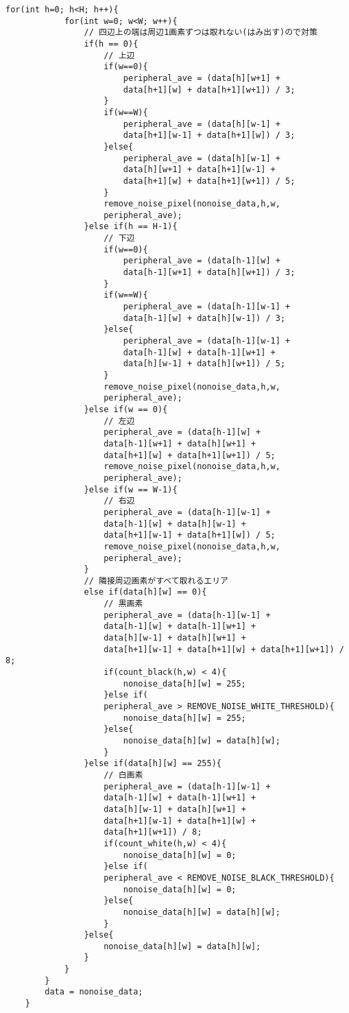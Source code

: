 \begin{lstlisting}[basicstyle=\ttfamily\footnotesize, frame=single]
		for(int h=0; h<H; h++){
			for(int w=0; w<W; w++){
				// 四辺上の端は周辺1画素ずつは取れない(はみ出す)ので対策
				if(h == 0){
					// 上辺
					if(w==0){
						peripheral_ave = (data[h][w+1] +
                        data[h+1][w] + data[h+1][w+1]) / 3;
					}
					if(w==W){
						peripheral_ave = (data[h][w-1] +
                        data[h+1][w-1] + data[h+1][w]) / 3;
					}else{
						peripheral_ave = (data[h][w-1] +
                        data[h][w+1] + data[h+1][w-1] +
                        data[h+1][w] + data[h+1][w+1]) / 5;
					}
					remove_noise_pixel(nonoise_data,h,w,
                    peripheral_ave);
				}else if(h == H-1){
					// 下辺
					if(w==0){
						peripheral_ave = (data[h-1][w] +
                        data[h-1][w+1] + data[h][w+1]) / 3;
					}
					if(w==W){
						peripheral_ave = (data[h-1][w-1] +
                        data[h-1][w] + data[h][w-1]) / 3;
					}else{
						peripheral_ave = (data[h-1][w-1] +
                        data[h-1][w] + data[h-1][w+1] +
                        data[h][w-1] + data[h][w+1]) / 5;
					}
					remove_noise_pixel(nonoise_data,h,w,
                    peripheral_ave);
				}else if(w == 0){
					// 左辺
					peripheral_ave = (data[h-1][w] + 
                    data[h-1][w+1] + data[h][w+1] + 
                    data[h+1][w] + data[h+1][w+1]) / 5;
					remove_noise_pixel(nonoise_data,h,w,
                    peripheral_ave);
				}else if(w == W-1){
					// 右辺
					peripheral_ave = (data[h-1][w-1] +
                    data[h-1][w] + data[h][w-1] + 
                    data[h+1][w-1] + data[h+1][w]) / 5;
					remove_noise_pixel(nonoise_data,h,w,
                    peripheral_ave);
				}
				// 隣接周辺画素がすべて取れるエリア
				else if(data[h][w] == 0){
					// 黒画素
					peripheral_ave = (data[h-1][w-1] +
                    data[h-1][w] + data[h-1][w+1] + 
                    data[h][w-1] + data[h][w+1] + 
                    data[h+1][w-1] + data[h+1][w] + data[h+1][w+1]) / 8;
					if(count_black(h,w) < 4){
						nonoise_data[h][w] = 255;
					}else if(
                    peripheral_ave > REMOVE_NOISE_WHITE_THRESHOLD){
						nonoise_data[h][w] = 255;
					}else{
						nonoise_data[h][w] = data[h][w];
					}
				}else if(data[h][w] == 255){
					// 白画素
					peripheral_ave = (data[h-1][w-1] +
                    data[h-1][w] + data[h-1][w+1] +
                    data[h][w-1] + data[h][w+1] +
                    data[h+1][w-1] + data[h+1][w] +
                    data[h+1][w+1]) / 8;
					if(count_white(h,w) < 4){
						nonoise_data[h][w] = 0;
					}else if(
                    peripheral_ave < REMOVE_NOISE_BLACK_THRESHOLD){
						nonoise_data[h][w] = 0;
					}else{
						nonoise_data[h][w] = data[h][w];
					}
				}else{
					nonoise_data[h][w] = data[h][w];
				}
			}
		}
		data = nonoise_data;
	}

  \end{lstlisting}
